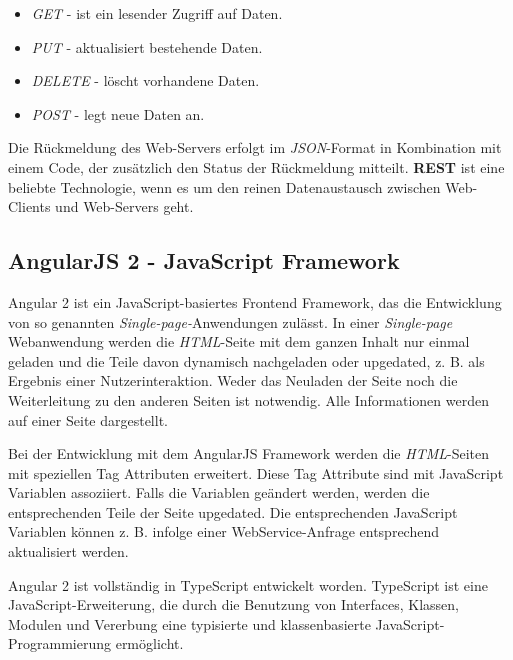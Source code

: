 \begin{itemize}

\item \textit{GET} - ist ein lesender Zugriff auf Daten.
\item \textit{PUT} - aktualisiert bestehende Daten.
\item \textit{DELETE} - löscht vorhandene Daten.
\item \textit{POST} - legt neue Daten an.

\end{itemize} 

Die Rückmeldung des Web-Servers erfolgt im \textit{JSON}-Format in Kombination mit einem Code, der zusätzlich den Status der Rückmeldung mitteilt.
\textbf{REST} ist eine beliebte Technologie, wenn es um den reinen Datenaustausch zwischen Web-Clients und Web-Servers geht. 

\subsection{AngularJS 2 - JavaScript Framework}
Angular 2 ist ein JavaScript-basiertes Frontend Framework, das die Entwicklung von so genannten \textit{Single-page-}Anwendungen zulässt. In einer \textit{Single-page} Webanwendung werden die \textit{HTML}-Seite mit dem ganzen Inhalt nur einmal geladen und die Teile davon dynamisch nachgeladen oder upgedated, z. B. als Ergebnis einer Nutzerinteraktion. Weder das Neuladen der Seite noch die Weiterleitung zu den anderen Seiten ist notwendig. Alle Informationen werden auf einer Seite dargestellt. 

Bei der Entwicklung mit dem AngularJS Framework werden die \textit{HTML}-Seiten mit speziellen Tag Attributen erweitert. Diese Tag Attribute sind mit JavaScript Variablen assoziiert. Falls die Variablen geändert werden, werden die entsprechenden Teile der Seite upgedated. Die entsprechenden JavaScript Variablen können z. B. infolge einer WebService-Anfrage entsprechend aktualisiert werden. 

Angular 2 ist vollständig in TypeScript entwickelt worden. TypeScript ist eine JavaScript-Erweiterung, die durch die Benutzung von Interfaces, Klassen, Modulen und Vererbung eine typisierte und klassenbasierte JavaScript-Programmierung ermöglicht. \cite{typescript}


